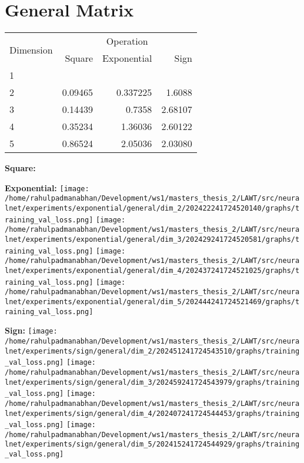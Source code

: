 \documentclass{article}
\begin{document}
\pagebreak
\section{General Matrix}
\begin{tabular}{@{}lrrr@{}}
\toprule
\multirow{2}{*}{Dimension} & \multicolumn{3}{c}{Operation} \\
\cmidrule(l){2-4}
& Square & Exponential & Sign \\
\midrule
1 & & & \\
2 & 0.09465 & 0.337225 & 1.6088 \\
3 & 0.14439 & 0.7358 & 2.68107 \\
4 & 0.35234 & 1.36036 & 2.60122 \\
5 & 0.86524 & 2.05036 & 2.03080 \\
\bottomrule
\end{tabular}

\textbf{Square:}

\textbf{Exponential:}
\texttt{[image: /home/rahulpadmanabhan/Development/ws1/masters\_thesis\_2/LAWT/src/neuralnet/experiments/exponential/general/dim\_2/202422241724520140/graphs/training\_val\_loss.png]}
\texttt{[image: /home/rahulpadmanabhan/Development/ws1/masters\_thesis\_2/LAWT/src/neuralnet/experiments/exponential/general/dim\_3/202429241724520581/graphs/training\_val\_loss.png]}
\texttt{[image: /home/rahulpadmanabhan/Development/ws1/masters\_thesis\_2/LAWT/src/neuralnet/experiments/exponential/general/dim\_4/202437241724521025/graphs/training\_val\_loss.png]}
\texttt{[image: /home/rahulpadmanabhan/Development/ws1/masters\_thesis\_2/LAWT/src/neuralnet/experiments/exponential/general/dim\_5/202444241724521469/graphs/training\_val\_loss.png]}

\textbf{Sign:}
\texttt{[image: /home/rahulpadmanabhan/Development/ws1/masters\_thesis\_2/LAWT/src/neuralnet/experiments/sign/general/dim\_2/202451241724543510/graphs/training\_val\_loss.png]}
\texttt{[image: /home/rahulpadmanabhan/Development/ws1/masters\_thesis\_2/LAWT/src/neuralnet/experiments/sign/general/dim\_3/202459241724543979/graphs/training\_val\_loss.png]}
\texttt{[image: /home/rahulpadmanabhan/Development/ws1/masters\_thesis\_2/LAWT/src/neuralnet/experiments/sign/general/dim\_4/202407241724544453/graphs/training\_val\_loss.png]}
\texttt{[image: /home/rahulpadmanabhan/Development/ws1/masters\_thesis\_2/LAWT/src/neuralnet/experiments/sign/general/dim\_5/202415241724544929/graphs/training\_val\_loss.png]}
\end{document}
